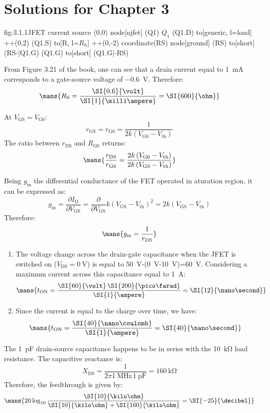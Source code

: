 \chapter{Solutions for Chapter 3}

\begin{circuit}{fig:3.1.1}{JFET current source}
    (0,0) node[njfet] (Q1) {$Q_1$}
    (Q1.D) to[generic, l=load] ++(0,2)
    (Q1.S) to[R, l=$R_\text{S}$] ++(0,-2) coordinate(RS)
    node[ground] {}
    (RS) to[short] (RS-|Q1.G)
    (Q1.G) to[short] (Q1.G|-RS)
\end{circuit}

From Figure 3.21 of the book, one can see that a drain current equal to \SI{1}{\milli\ampere} corresponds to a gate-source voltage of \SI{-0.6}{\volt}.
Therefore:
\[\mans{R_\text{S}=\frac{\SI{0.6}{\volt}}{\SI{1}{\milli\ampere}}=\SI{600}{\ohm}}\]

At $V_\text{GS}=V_\text{G0}$:
\[r_\text{GS}=r_\text{G0}=\frac{1}{2k\left(V_\text{G0}-V_\text{th}\right)}\]
The ratio between $r_\text{DS}$ and $R_\text{G0}$ returns:
\[\mans{\frac{r_\text{DS}}{r_\text{G0}}=\frac{2k\left(V_\text{G0}-V_\text{th}\right)}{2k\left(V_\text{GS}-V_\text{th}\right)}}\]

Being $g_\text{m}$ the differential conductance of the FET operated in aturation region, it can be expressed as:
\[g_\text{m}=\frac{\partial I_\text{D}}{\partial V_\text{GS}}=\frac{\partial}{\partial V_\text{GS}}k\left(V_\text{GS}-V_\text{th}\right)^2=2k\left(V_\text{GS}-V_\text{th}\right)\]
Therefore:
\[\mans{g_\text{m}=\frac{1}{r_\text{DS}}}\]

\begin{enumerate}
    \item The voltage change across the drain-gate capacitance when the JFET is switched on ($V_\text{DS}=\SI{0}{\volt}$) is equal to \SI{50}{\volt}-(\SI{0}{\volt}-\SI{10}{\volt})=\SI{60}{\volt}. Considering a maximum current across this capacitance equal to \SI{1}{\ampere}:
    \[\mans{t_\text{ON}=\frac{\SI{60}{\volt}\,\SI{200}{\pico\farad}}{\SI{1}{\ampere}}=\SI{12}{\nano\second}}\]
    \item Since the current is equal to the charge over time, we have:
    \[\mans{t_\text{ON}=\frac{\SI{40}{\nano\coulomb}}{\SI{1}{\ampere}}=\SI{40}{\nano\second}}\]
\end{enumerate}

The \SI{1}{\pico\farad} drain-source capacitance happens to be in series with the \SI{10}{\kilo\ohm} load resistance. The capacitive reactance is:
\[X_\text{DS}=\frac{1}{2\pi\SI{1}{\mega\hertz}\,\SI{1}{\pico\farad}}=\SI{160}{\kilo\ohm}\]
Therefore, the feedthrough is given by:
\[\mans{20\log_{10}\frac{\SI{10}{\kilo\ohm}}{\SI{10}{\kilo\ohm}+\SI{160}{\kilo\ohm}}=\SI{-25}{\decibel}}\]

